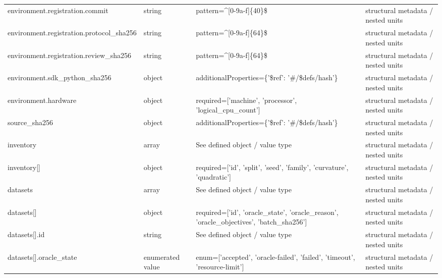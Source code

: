 \begin{longtable}{@{}>{\raggedright\arraybackslash}p{}>{\raggedright\arraybackslash}p{}>{\raggedright\arraybackslash}p{}>{\raggedright\arraybackslash}p{}@{}}
environment.\allowbreak{}registration.\allowbreak{}commit & string & pattern=\allowbreak{}\textasciicircum{}[0-9a-\allowbreak{}f]\{40\}\$ & structural metadata /\allowbreak{} nested units\\
environment.\allowbreak{}registration.\allowbreak{}protocol\_\allowbreak{}sha256 & string & pattern=\allowbreak{}\textasciicircum{}[0-9a-\allowbreak{}f]\{64\}\$ & structural metadata /\allowbreak{} nested units\\
environment.\allowbreak{}registration.\allowbreak{}review\_\allowbreak{}sha256 & string & pattern=\allowbreak{}\textasciicircum{}[0-9a-\allowbreak{}f]\{64\}\$ & structural metadata /\allowbreak{} nested units\\
environment.\allowbreak{}sdk\_\allowbreak{}python\_\allowbreak{}sha256 & object & additionalProperties=\allowbreak{}\{'\$ref': '\#/\allowbreak{}\$defs/\allowbreak{}hash'\} & structural metadata /\allowbreak{} nested units\\
environment.\allowbreak{}hardware & object & required=\allowbreak{}['machine', 'processor', 'logical\_\allowbreak{}cpu\_\allowbreak{}count'] & structural metadata /\allowbreak{} nested units\\
source\_\allowbreak{}sha256 & object & additionalProperties=\allowbreak{}\{'\$ref': '\#/\allowbreak{}\$defs/\allowbreak{}hash'\} & structural metadata /\allowbreak{} nested units\\
inventory & array & See defined object /\allowbreak{} value type & structural metadata /\allowbreak{} nested units\\
inventory[] & object & required=\allowbreak{}['id', 'split', 'seed', 'family', 'curvature', 'quadratic'] & structural metadata /\allowbreak{} nested units\\
datasets & array & See defined object /\allowbreak{} value type & structural metadata /\allowbreak{} nested units\\
datasets[] & object & required=\allowbreak{}['id', 'oracle\_\allowbreak{}state', 'oracle\_\allowbreak{}reason', 'oracle\_\allowbreak{}objectives', 'batch\_\allowbreak{}sha256'] & structural metadata /\allowbreak{} nested units\\
datasets[].\allowbreak{}id & string & See defined object /\allowbreak{} value type & structural metadata /\allowbreak{} nested units\\
datasets[].\allowbreak{}oracle\_\allowbreak{}state & enumerated value & enum=\allowbreak{}['accepted', 'oracle-\allowbreak{}failed', 'failed', 'timeout', 'resource-\allowbreak{}limit'] & structural metadata /\allowbreak{} nested units\\

\end{longtable}
